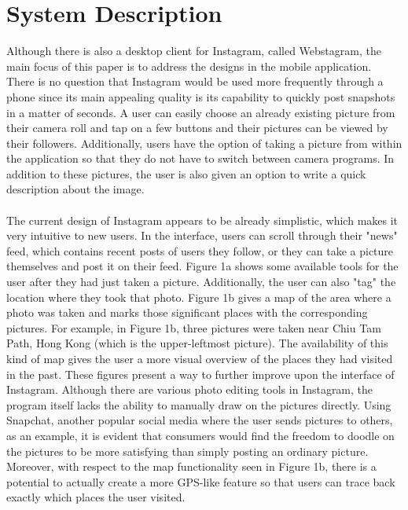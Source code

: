 \documentclass[11pt]{article}
\begin{document}
     
\section{System Description}
\label{System Description}
   \indent 
   \indent Although there is also a desktop client for Instagram, called Webstagram, the main focus of this paper is to address the designs in the mobile application. There is no question that Instagram would be used more frequently through a phone since its main appealing quality is its capability to quickly post snapshots in a matter of seconds. A user can easily choose an already existing picture from their camera roll and tap on a few buttons and their pictures can be viewed by their followers. Additionally, users have the option of taking a picture from within the application so that they do not have to switch between camera programs. In addition to these pictures, the user is also given an option to write a quick description about the image. \\ \\
   \indent The current design of Instagram appears to be already simplistic, which makes it very intuitive to new users. In the interface, users can scroll through their "news" feed, which contains recent posts of users they follow, or they can take a picture themselves and post it on their feed. Figure 1a shows some available tools for the user after they had just taken a picture. Additionally, the user can also "tag" the location where they took that photo. Figure 1b gives a map of the area where a photo was taken and marks those significant places with the corresponding pictures. For example, in Figure 1b, three pictures were taken near Chiu Tam Path, Hong Kong (which is the upper-leftmost picture). The availability of this kind of map gives the user a more visual overview of the places they had visited in the past. 
   \indent These figures present a way to further improve upon the interface of Instagram. Although there are various photo editing tools in Instagram, the program itself lacks the ability to manually draw on the pictures directly. Using Snapchat, another popular social media where the user sends pictures to others, as an example, it is evident that consumers would find the freedom to doodle on the pictures to be more satisfying than simply posting an ordinary picture. Moreover, with respect to the map functionality seen in Figure 1b, there is a potential to actually create a more GPS-like feature so that users can trace back exactly which places the user visited.
      
\end{document}
